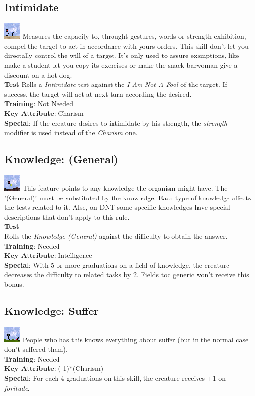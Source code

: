 \documentclass[ letterpaper,12pt]{article}
\begin{document}
\subsection{Intimidate}
\includegraphics{../data/skills/Img/intimidar.png}
Measures the capacity to, throught gestures, words or strength exhibition, compel the target to act in accordance with yours orders. This skill don't let you directally control the will of a target. It's only used to assure exemptions, like make a student let you copy its exercises or make the snack-barwoman give a discount on a hot-dog.\\
{\bf Test}
Rolls a {\it Intimidate} test against the {\it I Am Not A Fool} of the target. If success, the target will act at next turn according the desired.\\
{\bf Training}: Not Needed\\
{\bf Key Attribute}: Charism\\
{\bf Special}: If the creature desires to intimidate by his strength, the {\it strength} modifier is used instead of the {\it Charism} one.

\subsection{Knowledge: (General)}
\includegraphics{../data/skills/Img/cnhgeral.png}
This feature points to any knowledge the organism might have. The '(General)' must be substituted by the knowledge. Each type of  knowledge affects the tests related to it. Also, on DNT some specific knowledges have special descriptions that don't apply to this rule.\\
{\bf Test}\\
Rolls the {\it Knowledge (General)} against the difficulty to obtain the answer.\\
{\bf Training}: Needed\\
{\bf Key Attribute}: Intelligence\\
{\bf Special}: With 5 or more graduations on a field of knowledge, the creature decreases the difficulty to related tasks by 2. Fields too generic won't receive this bonus.

\subsection{Knowledge: Suffer}
\includegraphics{../data/skills/Img/cnhsofrimento.png}
People who has this knows everything about suffer (but in the normal case don't suffered them).\\
{\bf Training}: Needed\\
{\bf Key Attribute}: (-1)*(Charism)\\
{\bf Special}: For each 4 graduations on this skill, the creature receives +1 on {\it foritude}.
\end{document}
